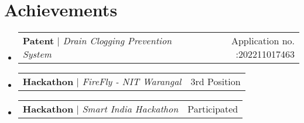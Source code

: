 \documentclass[letterpaper,11pt]{article}%
\makeatletter
\newcommand{\resumeProjectHeading}[2]{
    \item
    \begin{tabular*}{0.97\textwidth}{l@{\extracolsep{\fill}}r}
      \small#1 & #2 \\
    \end{tabular*}\vspace{-7pt}
}
\newcommand{\resumeSubHeadingListStart}{\begin{itemize}[leftmargin=0.15in, label={}]}
\newcommand{\resumeSubHeadingListEnd}{\end{itemize}}
\makeatother
\begin{document}
\section{Achievements}%
\label{sec:Achievements}%

%
\resumeSubHeadingListStart%
\resumeProjectHeading%
{\textbf{Patent} $|$ \footnotesize\emph{Drain Clogging Prevention System}}{Application no. :202211017463}%
\resumeProjectHeading%
{\textbf{Hackathon} $|$ \footnotesize\emph{FireFly - NIT Warangal}}{3rd Position}%
\resumeProjectHeading%
{\textbf{Hackathon} $|$ \footnotesize\emph{Smart India Hackathon}}{Participated}%
\resumeSubHeadingListEnd%
\end{document}
